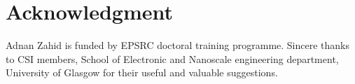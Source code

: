 \documentclass[preprints,article,accept,moreauthors,pdftex]{Definitions/mdpi}
\renewcommand{\^}{\hat}  %
\begin{document}
\section*{Acknowledgment}
Adnan Zahid is funded by EPSRC doctoral training programme. Sincere thanks to CSI members, School of Electronic and Nanoscale engineering department, University of Glasgow for their useful and valuable suggestions.

%
%
%
%
%
%
%
\end{document}
